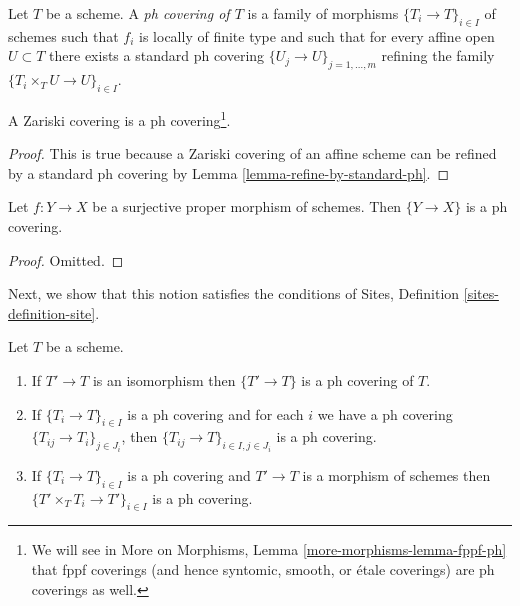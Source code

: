 \begin{definition}
\label{definition-ph-covering}
Let $T$ be a scheme. A {\it ph covering of $T$} is a family
of morphisms $\{T_i \to T\}_{i \in I}$ of schemes such
that $f_i$ is locally of finite type and such that for every
affine open $U \subset T$ there exists a standard ph covering
$\{U_j \to U\}_{j = 1, \ldots, m}$ refining the family
$\{T_i \times_T U \to U\}_{i \in I}$.
\end{definition}

\begin{lemma}
\label{lemma-zariski-ph}
A Zariski covering is a ph covering\footnote{We will see
in More on Morphisms, Lemma \ref{more-morphisms-lemma-fppf-ph} that
fppf coverings (and hence syntomic, smooth, or \'etale coverings)
are ph coverings as well.}.
\end{lemma}

\begin{proof}
This is true because a Zariski covering of an affine scheme
can be refined by a standard ph covering by
Lemma \ref{lemma-refine-by-standard-ph}.
\end{proof}

\begin{lemma}
\label{lemma-surjective-proper-ph}
Let $f : Y \to X$ be a surjective proper morphism of schemes.
Then $\{Y \to X\}$ is a ph covering.
\end{lemma}

\begin{proof}
Omitted.
\end{proof}

\noindent
Next, we show that this notion satisfies the conditions of
Sites, Definition \ref{sites-definition-site}.

\begin{lemma}
\label{lemma-ph}
Let $T$ be a scheme.
\begin{enumerate}
\item If $T' \to T$ is an isomorphism then $\{T' \to T\}$
is a ph covering of $T$.
\item If $\{T_i \to T\}_{i\in I}$ is a ph covering and for each
$i$ we have a ph covering $\{T_{ij} \to T_i\}_{j\in J_i}$, then
$\{T_{ij} \to T\}_{i \in I, j\in J_i}$ is a ph covering.
\item If $\{T_i \to T\}_{i\in I}$ is a ph covering
and $T' \to T$ is a morphism of schemes then
$\{T' \times_T T_i \to T'\}_{i\in I}$ is a ph covering.
\end{enumerate}
\end{lemma}

